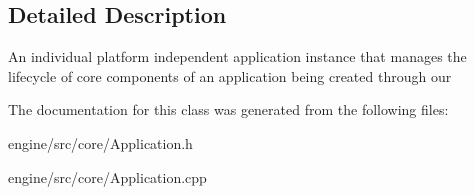 \subsection{Detailed Description}
An individual platform independent application instance that manages the lifecycle of core components of an application being created through our

The documentation for this class was generated from the following files\+:\begin{DoxyCompactItemize}
\item
engine/src/core/Application.\+h\item
engine/src/core/Application.\+cpp\end{DoxyCompactItemize}
